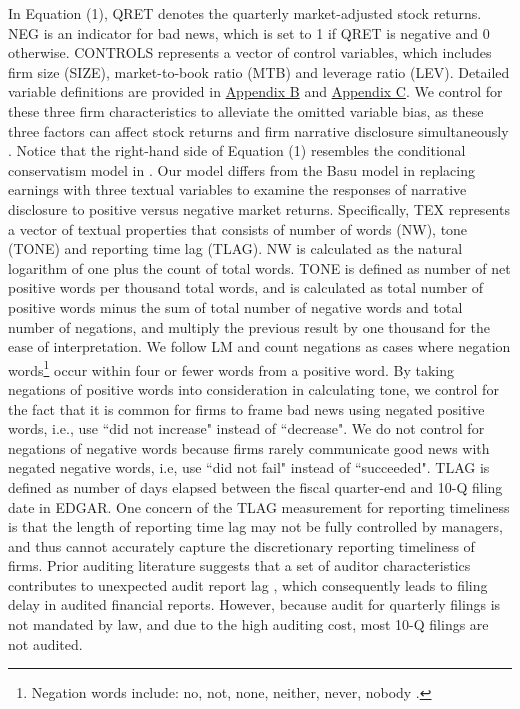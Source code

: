 \documentclass[a4paper]{article}
\begin{document}
\begin{spacing}{2}
In Equation (1), QRET denotes the quarterly market-adjusted stock returns. NEG is an indicator for bad news, which is set to 1 if QRET is negative and 0 otherwise. CONTROLS represents a vector of control variables, which includes firm size (SIZE), market-to-book ratio (MTB) and leverage ratio (LEV). Detailed variable definitions are provided in \hyperref[appb]{Appendix B} and \hyperref[appc]{Appendix C}. We control for these three firm characteristics to alleviate the omitted variable bias, as these three factors can affect stock returns and firm narrative disclosure simultaneously . %
Notice that the right-hand side of Equation (1) resembles the conditional conservatism model in . Our model differs from the Basu model in replacing earnings with three textual variables to examine the responses of narrative disclosure to positive versus negative market returns. Specifically, TEX represents a vector of textual properties that consists of number of words (NW), tone (TONE) and reporting time lag (TLAG). NW is calculated as the natural logarithm of one plus the count of total words. TONE is defined as number of net positive words per thousand total words, and is calculated as total number of positive words minus the sum of total number of negative words and total number of negations, and multiply the previous result by one thousand for the ease of interpretation. We follow LM and count negations as cases where negation words\footnote{Negation words include: no, not, none, neither, never, nobody .} occur within four or fewer words from a positive word. By taking negations of positive words into consideration in calculating tone, we control for the fact that it is common for firms to frame bad news using negated positive words, i.e., use ``did not increase" instead of ``decrease". We do not control for negations of negative words because firms rarely communicate good news with negated negative words, i.e, use ``did not fail" instead of ``succeeded". TLAG is defined as number of days elapsed between the fiscal quarter-end and 10-Q filing date in EDGAR. One concern of the TLAG measurement for reporting timeliness is that the length of reporting time lag may not be fully controlled by managers, and thus cannot accurately capture the discretionary reporting timeliness of firms. Prior auditing literature suggests that a set of auditor characteristics contributes to unexpected audit report lag , which consequently leads to filing delay in audited financial reports. However, because audit for quarterly filings is not mandated by law, and due to the high auditing cost, most 10-Q filings are not audited.


\end{spacing}
\end{document}
